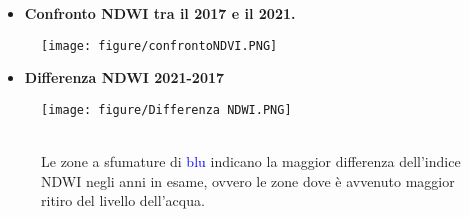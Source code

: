 \documentclass[10pt]{beamer}
\begin{document}
\begin{frame} {}
    \begin{itemize}
      \item \textbf{Confronto NDWI tra il 2017 e il 2021.}
    \end{itemize}
    \begin{figure}
      \centering
      \bigskip 
      \texttt{[image: figure/confrontoNDVI.PNG]}
    \end{figure}
\end{frame}


\begin{frame} {}
    \begin{itemize}
      \item \textbf{Differenza NDWI 2021-2017}
    \end{itemize}
    \begin{figure}
      \bigskip 
      \texttt{[image: figure/Differenza NDWI.PNG]}
      {\\ Le zone a sfumature di \textcolor{blue}{ blu} indicano la maggior differenza dell'indice NDWI negli anni in esame, ovvero le zone dove è avvenuto maggior ritiro del livello dell'acqua.\par}
    \end{figure}
\end{frame}
\end{document}
